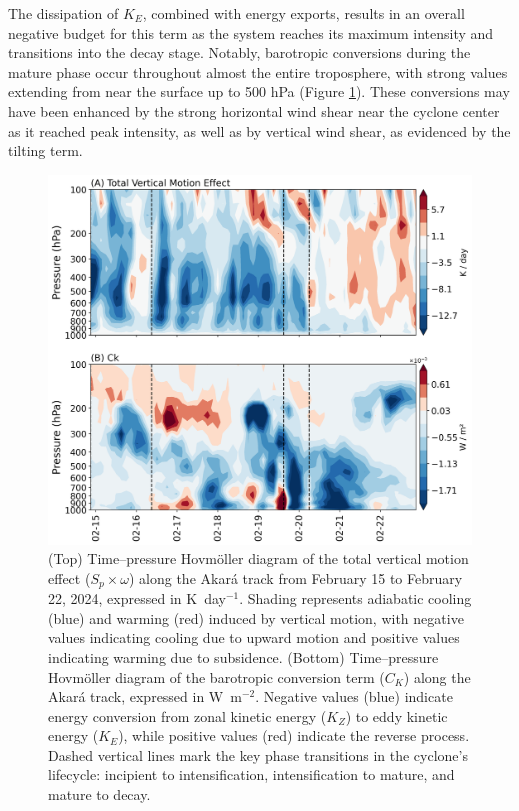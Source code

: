 \documentclass[pdflatex,sn-chicago]{sn-jnl}%
\theoremstyle{plain}
\theoremstyle{definition}
\theoremstyle{remark}
\theoremstyle{definition}
\begin{document}
The dissipation of $K_E$, combined with energy exports, results in an overall negative budget for this term as the system reaches its maximum intensity and transitions into the decay stage. Notably, barotropic conversions during the mature phase occur throughout almost the entire troposphere, with strong values extending from near the surface up to 500 hPa (Figure \ref{fig:SigmaOmega_Ck_combined_hov}). These conversions may have been enhanced by the strong horizontal wind shear near the cyclone center as it reached peak intensity, as well as by vertical wind shear, as evidenced by the tilting term.

\begin{figure}[h!]
\centering
\includegraphics[width=\textwidth]{SigmaOmega_Ck_combined_hov.png}
\caption{(Top) Time–pressure Hovmöller diagram of the total vertical motion effect ($S_p \times \omega$) along the Akará track from February 15 to February 22, 2024, expressed in K~day$^{-1}$. Shading represents adiabatic cooling (blue) and warming (red) induced by vertical motion, with negative values indicating cooling due to upward motion and positive values indicating warming due to subsidence. (Bottom) Time–pressure Hovmöller diagram of the barotropic conversion term ($C_K$) along the Akará track, expressed in W~m$^{-2}$. Negative values (blue) indicate energy conversion from zonal kinetic energy ($K_Z$) to eddy kinetic energy ($K_E$), while positive values (red) indicate the reverse process. Dashed vertical lines mark the key phase transitions in the cyclone's lifecycle: incipient to intensification, intensification to mature, and mature to decay.}
\label{fig:SigmaOmega_Ck_combined_hov}
\end{figure}
\end{document}
